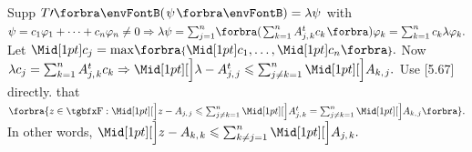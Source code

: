 

Supp $T\apostrophe\Par{\psi}=\lambda\psi$ with $\psi=c_1\varphi_1+\dots+c_n\varphi_n\neq0\Rightarrow\lambda\psi=\sum_{j=1}^n\!\BigBigPar{{\sum_{k=1}^nA^t_{j,\;\!k}c_k}}\varphi_k=\sum_{k=1}^nc_k\lambda \varphi_k.$\vspace{3pt}\parSol{}
Let $\aMid{c_j}=\max\!\Bra{\aMid{c_1},\dots,\aMid{c_n}}.$ Now $\lambda c_j=\sum_{k=1}^nA^t_{j,\;\!k}c_k\Rightarrow\aXMid{\lambda-A^t_{j,\;\!j}}\leqslant\sum_{j\neq k=1}^n\aXMid{A_{k,\;\!j}}.$\PfEnd\vspace{5pt}\parSol{}
\Or Use [5.67] directly. \NOTICE that $\BigBra{z\in\Fbb:\aXMid{z-A_{j,\;\!j}}\leqslant\sum_{j\neq k=1}^n\aXMid{A^t_{j,\;\!k}}=\sum_{j\neq k=1}^n\aXMid{A_{k,\;\!j}}}.$\PfEnd\vspace{5pt}
\AComm In other words, $\aXMid{z-A_{k,\;\!k}}\leqslant\sum_{k\neq j=1}^n\aXMid{A_{j,\;\!k}}.$
\SepLine

\ChEnd


\vspace{4pt}


